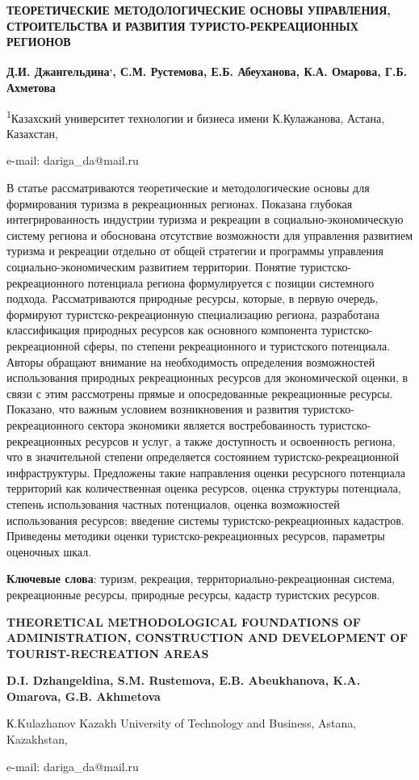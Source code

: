 \begin{center}
{\large\bfseries ТЕОРЕТИЧЕСКИЕ МЕТОДОЛОГИЧЕСКИЕ ОСНОВЫ УПРАВЛЕНИЯ, СТРОИТЕЛЬСТВА
И РАЗВИТИЯ ТУРИСТО-РЕКРЕАЦИОННЫХ РЕГИОНОВ}

{\bfseries Д.И. Джангельдина\textsuperscript{,}, С.М. Рустемова, Е.Б. Абеуханова, К.А. Омарова, Г.Б. Ахметова}

\textsuperscript{1}Казахский университет технологии и бизнеса имени
К.Кулажанова, Астана, Казахстан,

e-mail: dariga\_da@mail.ru
\end{center}

В статье рассматриваются теоретические и методологические основы для
формирования туризма в рекреационных регионах. Показана глубокая
интегрированность индустрии туризма и рекреации в
социально-экономическую систему региона и обоснована отсутствие
возможности для управления развитием туризма и рекреации отдельно от
общей стратегии и программы управления социально-экономическим развитием
территории. Понятие туристско-рекреационного потенциала региона
формулируется с позиции системного подхода. Рассматриваются природные
ресурсы, которые, в первую очередь, формируют туристско-рекреационную
специализацию региона, разработана классификация природных ресурсов как
основного компонента туристско-рекреационной сферы, по степени
рекреационного и туристского потенциала. Авторы обращают внимание на
необходимость определения возможностей использования природных
рекреационных ресурсов для экономической оценки, в связи с этим
рассмотрены прямые и опосредованные рекреационные ресурсы. Показано, что
важным условием возникновения и развития туристско-рекреационного
сектора экономики является востребованность туристско-рекреационных
ресурсов и услуг, а также доступность и освоенность региона, что в
значительной степени определяется состоянием туристско-рекреационной
инфраструктуры. Предложены такие направления оценки ресурсного
потенциала территорий как количественная оценка ресурсов, оценка
структуры потенциала, степень использования частных потенциалов, оценка
возможностей использования ресурсов; введение системы
туристско-рекреационных кадастров. Приведены методики оценки
туристско-рекреационных ресурсов, параметры оценочных шкал.

{\bfseries Ключевые слова}: туризм, рекреация, территориально-рекреационная
система, рекреационные ресурсы, природные ресурсы, кадастр туристских
ресурсов.

\begin{center}
{\large\bfseries THEORETICAL METHODOLOGICAL FOUNDATIONS OF ADMINISTRATION,
CONSTRUCTION AND DEVELOPMENT OF TOURIST-RECREATION AREAS}

{\bfseries D.I. Dzhangeldina, S.M. Rustemova, E.B. Abeukhanova, K.A. Omarova, G.B. Akhmetova}

К.Kulazhanov Kazakh University of Technology and Business, Astana,
Kazakhstan,

e-mail: dariga\_da@mail.ru
\end{center}

